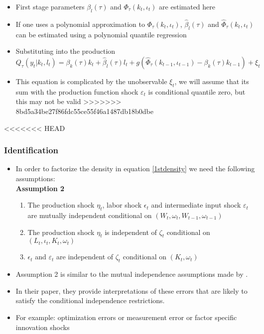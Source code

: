 \documentclass{beamer}
\begin{document}
\begin{frame}
\begin{itemize}
\begin{frame}
\begin{itemize}
	\item First stage parameters $\beta_{l}(\tau)$ and $\Phi_{\tau}(k_{t}, \iota_{t})$ are estimated here
	\item If one uses a polynomial approximation to $\Phi_{\tau}(k_{t}, \iota_{t})$, $\hat{\beta}_{l}(\tau)$ and $\hat{\Phi}_{\tau}(k_{t}, \iota_{t})$ can be estimated using a polynomial quantile regression
	
	\item Substituting into the production
	\begin{equation}
	Q_{\tau}(y_{t}|k_{t}, l_{t})=\beta_{k}(\tau)k_{t}+\hat{\beta}_{l}(\tau)l_{t}+g(\hat{\Phi}_{\tau}(k_{t-1}, \iota_{t-1})-\beta_{k}(\tau)k_{t-1})+\xi_{t}
	\end{equation}
	
	\item This equation is complicated by the unobservable $\xi_{t}$, we will assume that its sum with the production function shock $\varepsilon_{t}$ is conditional quantile zero, but this may not be valid
>>>>>>> 8bd5a34be27f86fdc55ce55f46a1487db18b0dbe
\end{itemize}
\end{frame}

<<<<<<< HEAD
\begin{frame}
\frametitle{Identification}
\begin{itemize}
\item In order to factorize the density in equation \eqref{1stdensity} we need the following assumptions:\\
\textbf{Assumption 2}
\begin{enumerate}
    \item The production shock $\eta_{t}$, labor shock $\epsilon_{t}$ and intermediate input shock $\varepsilon_{t}$ are mutually independent conditional on $(W_{t}, \omega_{t}, W_{t-1}, \omega_{t-1})$
    \item The production shock $\eta_{t}$ is independent of $\zeta_{t}$ conditional on $(L_{t}, \iota_{t}, K_{t}, \omega_{t})$
    \item $\epsilon_{t}$ and $\varepsilon_{t}$ are independent of $\zeta_{t}$ conditional on $(K_{t}, \omega_{t})$
\end{enumerate}
\item Assumption 2 is similar to the mutual independence assumptions made by \cite{Hu2019}. 
\item In their paper, they provide interpretations of these errors that are likely to satisfy the conditional independence restrictions.
\item For example: optimization errors or measurement error or factor specific innovation shocks
\end{itemize}
\end{frame}


\end{itemize}
\end{frame}
\end{document}
